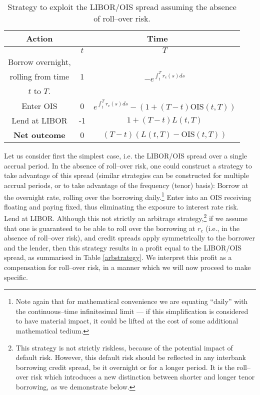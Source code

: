 \documentclass[12pt,a4paper]{article}
\theoremstyle{plain}
\numberwithin{equation}{section}
\begin{document}
\begin{table}[t]
  \centering

    \begin{tabular}{|c|c|c|}
    \hline
    \textbf{Action} & \multicolumn{2}{c|}{\textbf{Time }} \\
    \hline
          & $t$ & $T$ \\
          \hline
    Borrow overnight, & \multirow{3}[1]{*}{1} & \multirow{3}[1]{*}{$-e^{\int_t^Tr_c(s)ds}$} \\
    rolling from time &       &  \\
    $t$ to $T$. &       &  \\
   \hline
    Enter OIS & 0     &  $e^{\int_t^Tr_c(s)ds}-(1+(T-t)\text{OIS}(t,T))$\\
    \hline
    Lend at LIBOR & -1    & $1+(T-t)L(t,T)$  \\
    \hline
    \hline
    \textbf{Net outcome} & 0     &  $(T-t)(L(t,T)-\text{OIS}(t,T))$ \\
    \hline
    \hline
    \end{tabular}%
    \caption{Strategy to exploit the LIBOR/OIS spread assuming the absence of roll--over risk.}\label{arbstrategy}
  \label{tab:addlabel}%
\end{table}%

Let us consider first the simplest case, i.e. the LIBOR/OIS spread over a single accrual period. In the absence of roll--over risk, one could construct a strategy to take advantage of this spread (similar strategies can be constructed for multiple accrual periods, or to take advantage of the frequency (tenor) basis): Borrow at the overnight rate, rolling over the borrowing daily.\footnote{Note again that for mathematical convenience we are equating ``daily'' with the continuous--time infinitesimal limit --- if this simplification is considered to have material impact, it could be lifted at the cost of some additional mathematical tedium.} Enter into an OIS receiving floating and paying fixed, thus eliminating the exposure to interest rate risk. Lend at LIBOR. Although this not strictly an arbitrage strategy,\footnote{This strategy is not strictly riskless, because of the potential impact of default risk. However, this default risk should be reflected in any interbank borrowing credit spread, be it overnight or for a longer period. It is the roll--over risk which introduces a new distinction between shorter and longer tenor borrowing, as we demonstrate below.} if we assume that one is guaranteed to be able to roll over the borrowing at $r_c$ (i.e., in the absence of roll--over risk), and credit spreads apply symmetrically to the borrower and the lender, then this strategy results in a profit equal to the LIBOR/OIS spread, as summarised in Table \ref{arbstrategy}. We interpret this profit as a compensation for roll--over risk, in a manner which we will now proceed to make specific.
\end{document}
